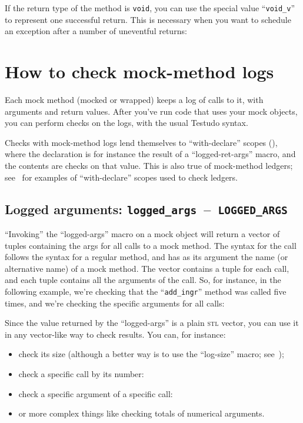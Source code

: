 \documentclass[twoside, a4paper, article]{memoir}
\newcommand*\testudocolor{\color{red!80!blue}}
\newcommand*\testudo[1]{\texttt{\testudocolor{}#1}}
\newcommand*\testudopair[2]{\testudo{#1}~--~\testudo{#2}}
\newcommand\subsectiontestudopair[3]{%
  \subsection[#1]{#1: \testudopair{#2}{#3}}}
\providecommand\typesetexample[1]{%
}
\begin{document}
If the return type of the method is \texttt{void}, you can use the special
value ``\texttt{void\_v}'' to represent one successful return.  This is
necessary when you want to schedule an exception after a number of uneventful
returns:

\typesetexample{mock-class-mock-method-schedule-exception-after-void}

\section{How to check mock-method logs}
\label{sec:check-mock-method-logs}

Each mock method (mocked or wrapped) keeps a log of calls to it, with arguments
and return values.  After you've run code that uses your mock objects, you can
perform checks on the logs, with the usual Testudo syntax.

Checks with mock-method logs lend themselves to ``with-declare'' scopes
(), where the declaration is for instance the
result of a ``logged-ret-args'' macro, and the contents are checks on that
value.  This is also true of mock-method ledgers; see~
for examples of ``with-declare'' scopes used to check ledgers.

\subsectiontestudopair{Logged arguments}{logged\_args}{LOGGED\_ARGS}

``Invoking'' the ``logged-args'' macro on a mock object will return a vector of
tuples containing the args for all calls to a mock method.  The syntax for the
call follows the syntax for a regular method, and has as its argument the name
(or alternative name) of a mock method.  The vector contains a tuple for each
call, and each tuple contains all the arguments of the call.  So, for instance,
in the following example, we're checking that the ``\texttt{add\_ingr}'' method
was called five times, and we're checking the specific arguments for all calls:

\typesetexample{check-mock-method-logs}

Since the value returned by the ``logged-args'' is a plain \textsc{stl} vector,
you can use it in any vector-like way to check results.  You can, for instance:
\begin{itemize}
\item check its size (although a better way is to use the ``log-size'' macro;
  see~);
\item check a specific call by its number:

  \typesetexample{check-mock-method-logs-specific-call}

\item check a specific argument of a specific call:

  \typesetexample{check-mock-method-logs-specific-call-specific-argument}

\item or more complex things like checking totals of numerical arguments.
\end{itemize}
\end{document}

